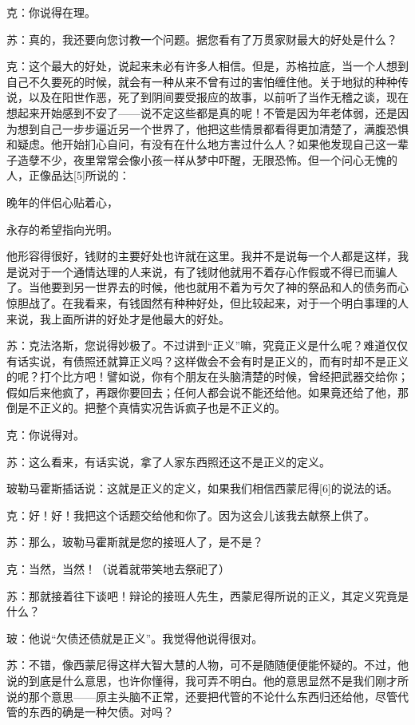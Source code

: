 \documentclass[12pt,oneside]{book}
\begin{document}
克：你说得在理。

苏：真的，我还要向您讨教一个问题。据您看有了万贯家财最大的好处是什么？

克：这个最大的好处，说起来未必有许多人相信。但是，苏格拉底，当一个人想到自己不久要死的时候，就会有一种从来不曾有过的害怕缠住他。关于地狱的种种传说，以及在阳世作恶，死了到阴间要受报应的故事，以前听了当作无稽之谈，现在想起来开始感到不安了——说不定这些都是真的呢！不管是因为年老体弱，还是因为想到自己一步步逼近另一个世界了，他把这些情景都看得更加清楚了，满腹恐惧和疑虑。他开始扪心自问，有没有在什么地方害过什么人？如果他发现自己这一辈子造孽不少，夜里常常会像小孩一样从梦中吓醒，无限恐怖。但一个问心无愧的人，正像品达[5]所说的：





晚年的伴侣心贴着心，

永存的希望指向光明。





他形容得很好，钱财的主要好处也许就在这里。我并不是说每一个人都是这样，我是说对于一个通情达理的人来说，有了钱财他就用不着存心作假或不得已而骗人了。当他要到另一世界去的时候，他也就用不着为亏欠了神的祭品和人的债务而心惊胆战了。在我看来，有钱固然有种种好处，但比较起来，对于一个明白事理的人来说，我上面所讲的好处才是他最大的好处。

苏：克法洛斯，您说得妙极了。不过讲到“正义”嘛，究竟正义是什么呢？难道仅仅有话实说，有债照还就算正义吗？这样做会不会有时是正义的，而有时却不是正义的呢？打个比方吧！譬如说，你有个朋友在头脑清楚的时候，曾经把武器交给你；假如后来他疯了，再跟你要回去；任何人都会说不能还给他。如果竟还给了他，那倒是不正义的。把整个真情实况告诉疯子也是不正义的。

克：你说得对。

苏：这么看来，有话实说，拿了人家东西照还这不是正义的定义。

玻勒马霍斯插话说：这就是正义的定义，如果我们相信西蒙尼得[6]的说法的话。

克：好！好！我把这个话题交给他和你了。因为这会儿该我去献祭上供了。

苏：那么，玻勒马霍斯就是您的接班人了，是不是？

克：当然，当然！（说着就带笑地去祭祀了）

苏：那就接着往下谈吧！辩论的接班人先生，西蒙尼得所说的正义，其定义究竟是什么？

玻：他说“欠债还债就是正义”。我觉得他说得很对。

苏：不错，像西蒙尼得这样大智大慧的人物，可不是随随便便能怀疑的。不过，他说的到底是什么意思，也许你懂得，我可弄不明白。他的意思显然不是我们刚才所说的那个意思——原主头脑不正常，还要把代管的不论什么东西归还给他，尽管代管的东西的确是一种欠债。对吗？
\end{document}
